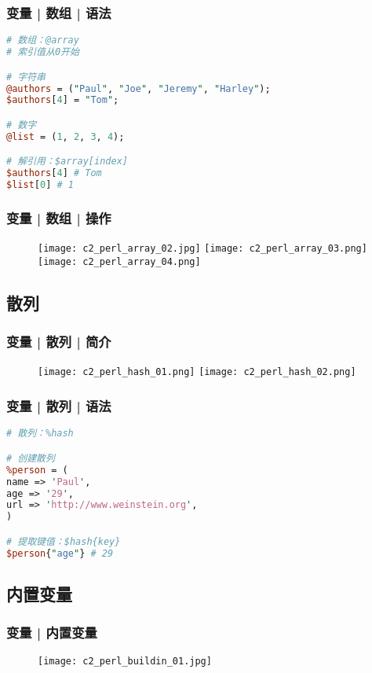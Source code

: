 \begin{frame}[fragile]
  \frametitle{变量 | 数组 | \alert{语法}}
\begin{lstlisting}[language=Perl]
# 数组：@array
# 索引值从0开始

# 字符串
@authors = ("Paul", "Joe", "Jeremy", "Harley");
$authors[4] = "Tom";

# 数字
@list = (1, 2, 3, 4);

# 解引用：$array[index]
$authors[4] # Tom
$list[0] # 1
\end{lstlisting}
\end{frame}

\begin{frame}
  \frametitle{变量 | 数组 | \alert{操作}}
  \begin{figure}
    \centering
    \texttt{[image: c2\_perl\_array\_02.jpg]}
    \vspace{0.5cm}
    \texttt{[image: c2\_perl\_array\_03.png]}
    \texttt{[image: c2\_perl\_array\_04.png]}
  \end{figure}
\end{frame}

\subsection{散列}
\begin{frame}
  \frametitle{变量 | 散列 | 简介}
  \begin{figure}
    \centering
    \texttt{[image: c2\_perl\_hash\_01.png]}\qquad
    \texttt{[image: c2\_perl\_hash\_02.png]}
  \end{figure}
\end{frame}

\begin{frame}[fragile]
  \frametitle{变量 | 散列 | \alert{语法}}
\begin{lstlisting}[language=Perl]
# 散列：%hash

# 创建散列
%person = (
name => 'Paul',
age => '29',
url => 'http://www.weinstein.org',
)

# 提取键值：$hash{key}
$person{"age"} # 29
\end{lstlisting}
\end{frame}

\subsection{内置变量}
\begin{frame}
  \frametitle{变量 | 内置变量}
  \begin{figure}
    \centering
    \texttt{[image: c2\_perl\_buildin\_01.jpg]}
  \end{figure}
\end{frame}

